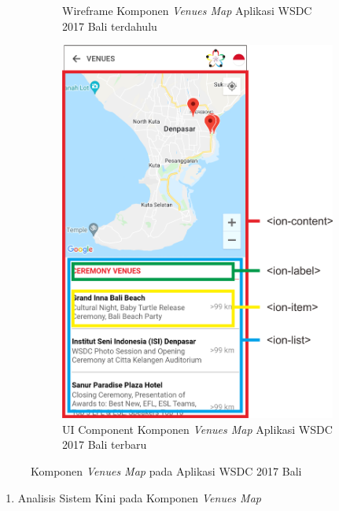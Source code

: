 \begin{enumerate}
\begin{figure}[H]
\begin{subfigure}[b]{0.43\textwidth}
         	\caption{Wireframe Komponen \textit{Venues Map} Aplikasi WSDC 2017 Bali terdahulu}
         	\label{fig:VenueMapPageWireframe}
     	\end{subfigure}
     	\hspace*{0.5in}
     	\begin{subfigure}[b]{0.43\textwidth}
         	\centering
         	\includegraphics[scale=0.4]{Gambar/VenueMapKini.png}
         	\caption{UI Component Komponen \textit{Venues Map} Aplikasi WSDC 2017 Bali terbaru}
         	\label{fig:VenueMapKini}
     	\end{subfigure}
        \caption{Komponen \textit{Venues Map} pada Aplikasi WSDC 2017 Bali}
        \label{fig:UIComponent1}
	\end{figure}
	\begin{enumerate}
		\item Analisis Sistem Kini pada Komponen \textit{Venues Map} \\

\end{enumerate}
\end{enumerate}
